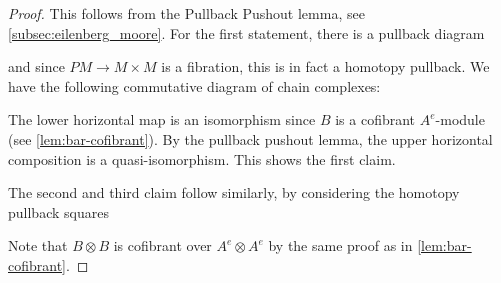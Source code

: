 \documentclass{scrartcl}
\theoremstyle{plain}
\theoremstyle{definition}
\DeclareMathOperator{\Map}{Map}
\begin{document}
\begin{proof}
    This follows from the Pullback Pushout lemma, see \autoref{subsec:eilenberg_moore}. For the first statement, there is a pullback diagram 
    \begin{center}
    \end{center}
    and since $PM\to M\times M$ is a fibration, this is in fact a homotopy pullback. We have the following commutative diagram of chain complexes:
    \begin{center}
    \end{center}
    The lower horizontal map is an isomorphism since $B$ is a cofibrant $A^e$-module (see \autoref{lem:bar-cofibrant}). By the pullback pushout lemma, the upper horizontal composition is a quasi-isomorphism. This shows the first claim.

    The second and third claim follow similarly, by considering the homotopy pullback squares

    \begin{center}
    \qquad
    \end{center}
    Note that $B\otimes B$ is cofibrant over $A^e\otimes A^e$ by the same proof as in \autoref{lem:bar-cofibrant}.
\end{proof}

\end{document}
